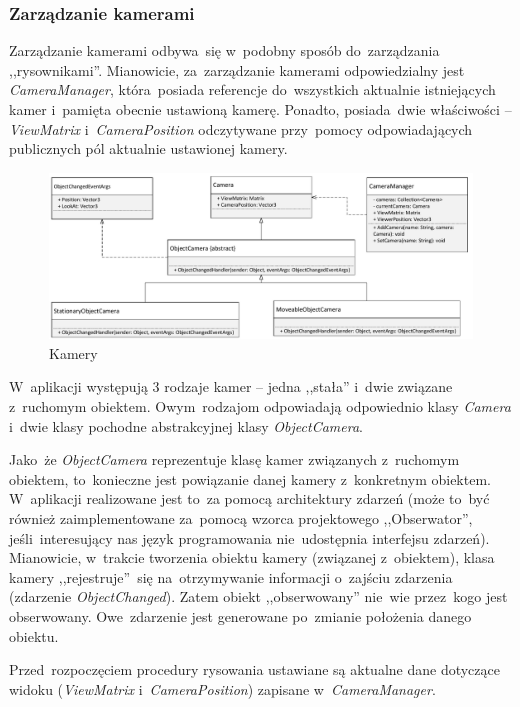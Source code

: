 \documentclass[11pt, a4paper, oneside]{scrartcl}
\begin{document}
\subsubsection{Zarządzanie kamerami}
Zarządzanie kamerami odbywa~się w~podobny sposób do~zarządzania ,,rysownikami''. Mianowicie, za~zarządzanie kamerami odpowiedzialny jest \textit{CameraManager}, która~posiada referencje do~wszystkich aktualnie istniejących kamer i~pamięta obecnie ustawioną kamerę. 
Ponadto, posiada~dwie właściwości -- \textit{ViewMatrix} i~\textit{CameraPosition} odczytywane przy~pomocy odpowiadających publicznych pól aktualnie
ustawionej kamery.  \\ 
\begin{figure}[H]
	\centering 
	\includegraphics[scale=0.6]{Cameras.pdf}
	\caption{Kamery}\label{fig:pictures}
\end{figure}

W~aplikacji występują 3 rodzaje kamer -- jedna ,,stała'' i~dwie związane z~ruchomym obiektem. Owym~rodzajom odpowiadają odpowiednio klasy
\textit{Camera} i~dwie klasy pochodne abstrakcyjnej klasy \textit{ObjectCamera}.

Jako~że \textit{ObjectCamera} reprezentuje klasę kamer związanych z~ruchomym obiektem, to~konieczne jest powiązanie danej kamery z~konkretnym
obiektem. W~aplikacji realizowane jest to~za pomocą architektury zdarzeń (może to~być również zaimplementowane za~pomocą wzorca projektowego ,,Obserwator'', jeśli~interesujący nas język programowania nie~udostępnia interfejsu zdarzeń). Mianowicie, w~trakcie tworzenia obiektu
kamery (związanej z~obiektem), klasa kamery ,,rejestruje''~się na~otrzymywanie informacji o~zajściu zdarzenia (zdarzenie \textit{ObjectChanged}).
Zatem obiekt ,,obserwowany'' nie~wie przez~kogo jest obserwowany. Owe~zdarzenie jest generowane po~zmianie położenia danego obiektu.

Przed~rozpoczęciem procedury rysowania ustawiane są aktualne dane dotyczące widoku (\textit{ViewMatrix} i~\textit{CameraPosition}) zapisane
w~\textit{CameraManager}.
\end{document}

